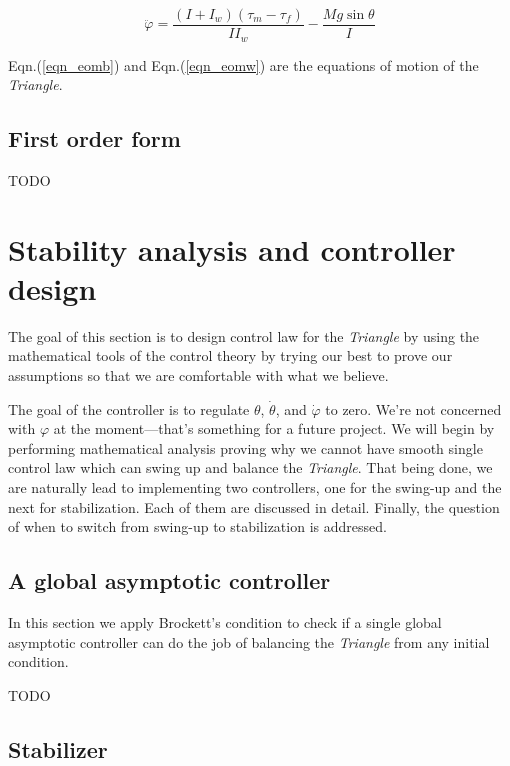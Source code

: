 \documentclass{article}
\begin{document}
\begin{equation}
  \label{eqn_eomw}
  \ddot{\varphi} = \dfrac{(I + I_w)(\tau_m - \tau_f)}{I I_w} - \dfrac{M g \sin\theta}{I}
\end{equation}

Eqn.(\ref{eqn_eomb}) and Eqn.(\ref{eqn_eomw}) are the equations of motion of the \textit{Triangle}.

\subsection{First order form}
\begin{center}
  TODO
\end{center}

\section{Stability analysis and controller design}

The goal of this section is to design control law for the \textit{Triangle} by using the mathematical tools of the control theory by trying our best to prove our assumptions so that we are comfortable with what we believe.

The goal of the controller is to regulate $\theta$,  $\dot{\theta}$, and $\dot{\varphi}$ to zero. We're not concerned with $\varphi$ at the moment—that's something for a future project. We will begin by performing mathematical analysis proving why we cannot have smooth single control law which can swing up and balance the \textit{Triangle}. That being done, we are naturally lead to implementing two controllers, one for the swing-up and the next for stabilization. Each of them are discussed in detail. Finally, the question of when to switch from swing-up to stabilization is addressed.

\subsection{A global asymptotic controller}

In this section we apply Brockett's condition to check if a single global asymptotic controller can do the job of balancing the \textit{Triangle} from any initial condition.
\begin{center}
  TODO
\end{center}

\subsection{Stabilizer}
\end{document}
